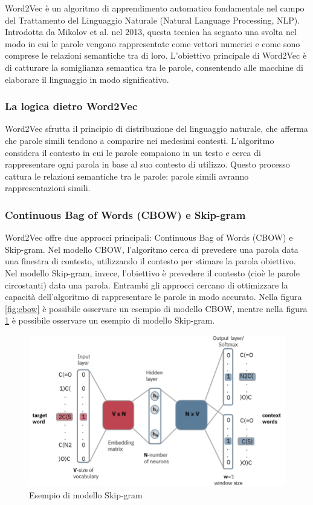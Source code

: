 Word2Vec \cite{w2v} è un algoritmo di apprendimento automatico fondamentale nel campo del Trattamento del Linguaggio Naturale (Natural Language Processing, NLP). Introdotta da Mikolov et al. nel 2013, questa tecnica ha segnato una svolta nel modo in cui le parole vengono rappresentate come vettori numerici e come sono comprese le relazioni semantiche tra di loro. L'obiettivo principale di Word2Vec è di catturare la somiglianza semantica tra le parole, consentendo alle macchine di elaborare il linguaggio in modo significativo.

\subsubsection{La logica dietro Word2Vec}
Word2Vec sfrutta il principio di distribuzione del linguaggio naturale, che afferma che parole simili tendono a comparire nei medesimi contesti. L'algoritmo considera il contesto in cui le parole compaiono in un testo e cerca di rappresentare ogni parola in base al suo contesto di utilizzo. Questo processo cattura le relazioni semantiche tra le parole: parole simili avranno rappresentazioni simili.

\subsubsection{Continuous Bag of Words (CBOW) e Skip-gram}
Word2Vec offre due approcci principali: Continuous Bag of Words (CBOW) e Skip-gram. Nel modello CBOW, l'algoritmo cerca di prevedere una parola data una finestra di contesto, utilizzando il contesto per stimare la parola obiettivo. Nel modello Skip-gram, invece, l'obiettivo è prevedere il contesto (cioè le parole circostanti) data una parola. Entrambi gli approcci cercano di ottimizzare la capacità dell'algoritmo di rappresentare le parole in modo accurato.
Nella figura \ref{fig:cbow} è possibile osservare un esempio di modello CBOW, mentre nella figura \ref{fig:skipgram} è possibile osservare un esempio di modello Skip-gram.
\begin{center}
    \begin{figure}[H]
        \centering
        \includegraphics[width=0.7\pdfpagewidth]{images/skipgram.jpg}
        \caption{Esempio di modello Skip-gram}
        \label{fig:skipgram}
    \end{figure}
\end{center}

